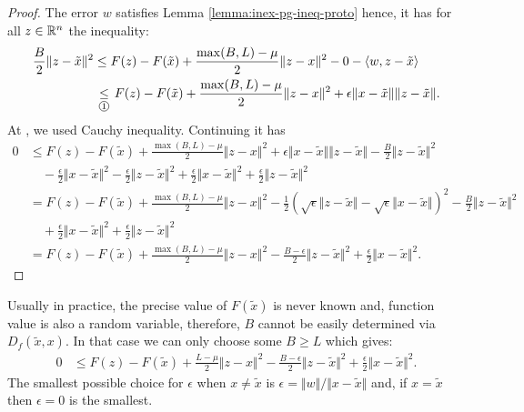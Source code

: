 \documentclass[12pt]{article}
\begin{document}
        \begin{proof}
            The error $w$ satisfies Lemma \ref{lemma:inex-pg-ineq-proto} hence, it has for all $z \in \mathbb R^n$ the inequality: 
            \begin{align*}
                \frac{B}{2}\Vert z - \tilde x\Vert^2
                &\le F(z) - F(\tilde x) + \frac{\max(B, L) - \mu}{2}\Vert z - x\Vert^2 - 0 - \langle w, z - \tilde x \rangle
                \\
                &\underset{\text{\circled{1}}}{\le}
                F(z) - F(\tilde x) + \frac{\max(B, L) - \mu}{2}\Vert z - x\Vert^2 + \epsilon \Vert x - \tilde x\Vert\Vert z - \tilde x\Vert. 
            \end{align*}
            At , we used Cauchy inequality. 
            Continuing it has 
            \begin{align*}
                0 &\le 
                F(z) - F(\tilde x) + \frac{\max(B, L) - \mu}{2}\Vert z - x\Vert^2
                + \epsilon \Vert x - \tilde x\Vert\Vert z - \tilde x\Vert 
                - \frac{B}{2}\Vert z - \tilde x\Vert^2
                    \\&\quad 
                    - \frac{\epsilon}{2}\Vert x - \tilde x\Vert^2 - \frac{\epsilon}{2}\Vert z - \tilde x \Vert^2
                    + \frac{\epsilon}{2}\Vert x - \tilde x\Vert^2 + \frac{\epsilon}{2}\Vert z - \tilde x \Vert^2
                \\
                &= F(z) - F(\tilde x) + \frac{\max(B, L) - \mu}{2}\Vert z - x\Vert^2
                - \frac{1}{2}\left(
                    \sqrt{\epsilon}\Vert z - \tilde x\Vert - \sqrt{\epsilon}\Vert x - \tilde x\Vert
                \right)^2
                - \frac{B}{2}\Vert z - \tilde x\Vert^2
                    \\
                    &\quad 
                    + \frac{\epsilon}{2}\Vert x - \tilde x\Vert^2 + \frac{\epsilon}{2}\Vert z - \tilde x \Vert^2
                \\
                &= F(z) - F(\tilde x) + \frac{\max(B, L) - \mu}{2}\Vert z - x\Vert^2
                - \frac{B - \epsilon}{2}\Vert z - \tilde x\Vert^2
                + \frac{\epsilon}{2}\Vert x - \tilde x \Vert^2. 
            \end{align*}
        \end{proof}
        \begin{remark}
            Usually in practice, the precise value of $F(\tilde x)$ is never known and, function value is also a random variable, therefore, $B$ cannot be easily determined via $D_f(\tilde x, x)$. 
            In that case we can only choose some $B \ge L$ which gives: 
            \begin{align*}
                0 &\le 
                F(z) - F(\tilde x) + \frac{L - \mu}{2}\Vert z - x\Vert^2
                - \frac{B - \epsilon}{2}\Vert z - \tilde x\Vert^2
                + \frac{\epsilon}{2}\Vert x - \tilde x \Vert^2.
            \end{align*}
            The smallest possible choice for $\epsilon$ when $x \neq \tilde x$ is $\epsilon = \Vert w\Vert/\Vert x - \tilde x\Vert$ and, if $x = \tilde x$ then $\epsilon = 0$ is the smallest. 
        \end{remark}
\end{document}
